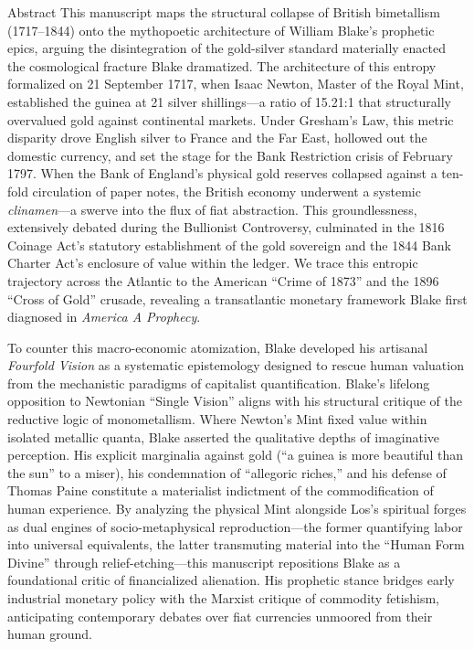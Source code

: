 \documentclass[
  ignorenonframetext,
]{beamer}
\author{\texorpdfstring{}{}}
\date{}
\begin{document}
\begin{frame}{Abstract}
\protect{}\label{abstract}
This manuscript maps the structural collapse of British bimetallism
(1717--1844) onto the mythopoetic architecture of William Blake's
prophetic epics, arguing the disintegration of the gold-silver standard
materially enacted the cosmological fracture Blake dramatized. The
architecture of this entropy formalized on 21 September 1717, when Isaac
Newton, Master of the Royal Mint, established the guinea at 21 silver
shillings---a ratio of 15.21:1 that structurally overvalued gold against
continental markets. Under Gresham's Law, this metric disparity drove
English silver to France and the Far East, hollowed out the domestic
currency, and set the stage for the Bank Restriction crisis of February
1797. When the Bank of England's physical gold reserves collapsed
against a ten-fold circulation of paper notes, the British economy
underwent a systemic \emph{clinamen}---a swerve into the flux of fiat
abstraction. This groundlessness, extensively debated during the
Bullionist Controversy, culminated in the 1816 Coinage Act's statutory
establishment of the gold sovereign and the 1844 Bank Charter Act's
enclosure of value within the ledger. We trace this entropic trajectory
across the Atlantic to the American ``Crime of 1873'' and the 1896
``Cross of Gold'' crusade, revealing a transatlantic monetary framework
Blake first diagnosed in \emph{America A Prophecy}.

To counter this macro-economic atomization, Blake developed his
artisanal \emph{Fourfold Vision} as a systematic epistemology designed
to rescue human valuation from the mechanistic paradigms of capitalist
quantification. Blake's lifelong opposition to Newtonian ``Single
Vision'' aligns with his structural critique of the reductive logic of
monometallism. Where Newton's Mint fixed value within isolated metallic
quanta, Blake asserted the qualitative depths of imaginative perception.
His explicit marginalia against gold (``a guinea is more beautiful than
the sun'' to a miser), his condemnation of ``allegoric riches,'' and his
defense of Thomas Paine constitute a materialist indictment of the
commodification of human experience. By analyzing the physical Mint
alongside Los's spiritual forges as dual engines of socio-metaphysical
reproduction---the former quantifying labor into universal equivalents,
the latter transmuting material into the ``Human Form Divine'' through
relief-etching---this manuscript repositions Blake as a foundational
critic of financialized alienation. His prophetic stance bridges early
industrial monetary policy with the Marxist critique of commodity
fetishism, anticipating contemporary debates over fiat currencies
unmoored from their human ground.
\end{frame}
\end{document}
